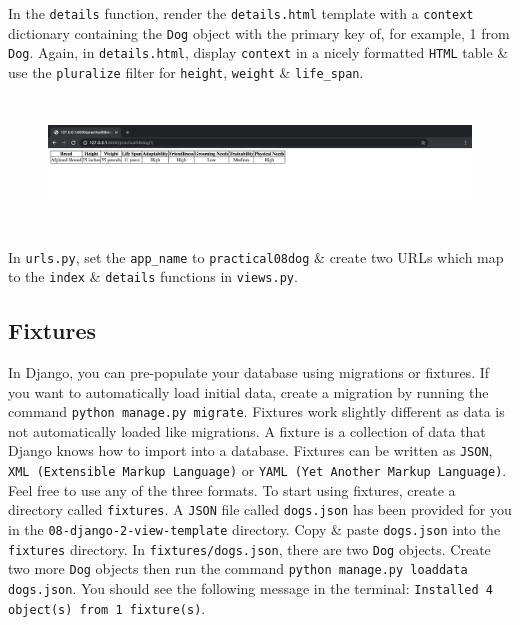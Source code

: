 \documentclass{article}
\begin{document}
In the \texttt{details} function, render the \texttt{details.html} template with a \texttt{context} dictionary containing the \texttt{Dog} object with the primary key of, for example, 1 from \texttt{Dog}. Again, in \texttt{details.html}, display \texttt{context} in a nicely formatted \texttt{HTML} table \& use the \texttt{pluralize} filter for \texttt{height}, \texttt{weight} \& \texttt{life\_span}. 

\begin{figure}[H]
  \includegraphics[width=175mm, height=35mm]{./img/08-expected-dog-3.png}
\end{figure}

In \texttt{urls.py}, set the \texttt{app\_name} to \texttt{practical08dog} \& create two URLs which map to the \texttt{index} \& \texttt{details} functions in \texttt{views.py}. 

\subsection*{Fixtures}  
In Django, you can pre-populate your database using migrations or fixtures. If you want to automatically load initial data, create a migration by running the command \texttt{python manage.py migrate}. Fixtures work slightly different as data is not automatically loaded like migrations. A fixture is a collection of data that Django knows how to import into a database. Fixtures can be written as \texttt{JSON}, \texttt{XML (Extensible Markup Language)} or \texttt{YAML (Yet Another Markup Language)}. Feel free to use any of the three formats. To start using fixtures, create a directory called \texttt{fixtures}. A \texttt{JSON} file called \texttt{dogs.json} has been provided for you in the \texttt{08-django-2-view-template} directory. Copy \& paste \texttt{dogs.json} into the \texttt{fixtures} directory. In \texttt{fixtures/dogs.json}, there are two \texttt{Dog} objects. Create two more \texttt{Dog} objects then run the command \texttt{python manage.py loaddata dogs.json}. You should see the following message in the terminal: \texttt{Installed 4 object(s) from 1 fixture(s)}.  \\
\end{document}
